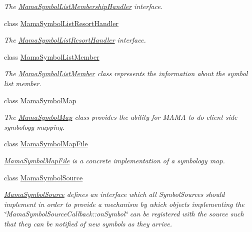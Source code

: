 \begin{DoxyCompactItemize}
\begin{DoxyCompactList}\small\item\em The \hyperlink{classWombat_1_1MamaSymbolListMembershipHandler}{MamaSymbolListMembershipHandler} interface. \item\end{DoxyCompactList}\item 
class \hyperlink{classWombat_1_1MamaSymbolListResortHandler}{MamaSymbolListResortHandler}
\begin{DoxyCompactList}\small\item\em The \hyperlink{classWombat_1_1MamaSymbolListResortHandler}{MamaSymbolListResortHandler} interface. \item\end{DoxyCompactList}\item 
class \hyperlink{classWombat_1_1MamaSymbolListMember}{MamaSymbolListMember}
\begin{DoxyCompactList}\small\item\em The \hyperlink{classWombat_1_1MamaSymbolListMember}{MamaSymbolListMember} class represents the information about the symbol list member. \item\end{DoxyCompactList}\item 
class \hyperlink{classWombat_1_1MamaSymbolMap}{MamaSymbolMap}
\begin{DoxyCompactList}\small\item\em The \hyperlink{classWombat_1_1MamaSymbolMap}{MamaSymbolMap} class provides the ability for MAMA to do client side symbology mapping. \item\end{DoxyCompactList}\item 
class \hyperlink{classWombat_1_1MamaSymbolMapFile}{MamaSymbolMapFile}
\begin{DoxyCompactList}\small\item\em \hyperlink{classWombat_1_1MamaSymbolMapFile}{MamaSymbolMapFile} is a concrete implementation of a symbology map. \item\end{DoxyCompactList}\item 
class \hyperlink{classWombat_1_1MamaSymbolSource}{MamaSymbolSource}
\begin{DoxyCompactList}\small\item\em \hyperlink{classWombat_1_1MamaSymbolSource}{MamaSymbolSource} defines an interface which all SymbolSources should implement in order to provide a mechanism by which objects implementing the \char`\"{}MamaSymbolSourceCallback::onSymbol\char`\"{} can be registered with the source such that they can be notified of new symbols as they arrive. \item\end{DoxyCompactList}\item 

\end{DoxyCompactItemize}
